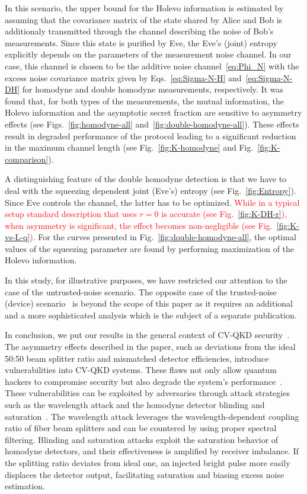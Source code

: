 \documentclass[%
reprint,
superscriptaddress,
 amsmath,amssymb,amsfonts,
 aps,
 pra,
 longbibliography
]{revtex4-2}
\begin{document}
In this scenario, the upper bound for the Holevo information is estimated by assuming that the
covariance matrix of the state shared by Alice and Bob is additionaly transmitted through the
channel describing the noise of Bob's measurements.
Since this state is purified by Eve, the Eve's (joint)
entropy explicitly depends on the parameters of the measurement noise channel.
In our case, this
channel is chosen to be the additive noise channel~\eqref{eq:Phi_N} with
the excess noise covariance matrix given by Eqs.~\eqref{eq:Sigma-N-H}
and~\eqref{eq:Sigma-N-DH} for homodyne and double homodyne measurements,
respectively.
It was found that, for both types of the measurements,
the mutual information, the Holevo information and the asymptotic secret fraction
are sensitive to asymmetry effects (see Figs.~\ref{fig:homodyne-all}
and~\ref{fig:double-homodyne-all}).
These effects result in degraded performance
of the protocol leading to a significant reduction in the maximum channel length
(see Fig.~\ref{fig:K-homodyne} and Fig.~\ref{fig:K-comparison}).

A distinguishing feature of the double homodyne detection is
that we have to deal with the squeezing dependent joint (Eve's) entropy 
(see Fig.~\ref{fig:Entropy}).
Since Eve controls the channel, the latter has to be optimized. \textcolor{red}{While in a typical setup standard description that uses $r=0$ is accurate (see Fig.~\ref{fig:K-DH-r}), when asymmetry is significant, the effect becomes non-negligible (see Fig.~\ref{fig:K-vs-L-q}). }
For the curves presented in Fig.~\ref{fig:double-homodyne-all},
the optimal values of the squeezing parameter
are found by performing maximization of the Holevo information.

In this study,
for illustrative purposes, we have restricted our attention to 
the case of the untrusted-noise scenario.
The opposite case of
the trusted-noise (device)
scenario~\cite{Lodewyck:pra:2007,Usenko:entropy:2016,Laudenbach:aqt:2019}
is beyond the scope of this paper
as it requires
an additional and a more sophisticated analysis which is the subject of a separate publication.

In conclusion,
we put our results in the general context of CV-QKD
  security~\cite{Zhang:apr:2024}.
  The asymmetry effects described in the paper, such as
deviations from the ideal 50:50 beam splitter ratio and mismatched detector efficiencies,
introduce vulnerabilities into CV-QKD systems.  These flaws not only allow quantum hackers to
compromise security but also degrade the system’s performance~\cite{Ruiz:heliyon:2023}.  These
vulnerabilities can be exploited by adversaries through attack strategies such as the wavelength
attack \cite{huang2012wavelength, huang2014quantum} and the homodyne detector blinding
\cite{qin2018homodyne} and saturation~\cite{qin2016quantum}. The wavelength attack leverages the
wavelength-dependent coupling ratio of fiber beam splitters and can be countered by using proper
spectral filtering. Blinding and saturation attacks exploit the saturation behavior of homodyne
detectors, and their effectiveness is amplified by receiver imbalance. If the splitting ratio
deviates from ideal one, an injected bright pulse more easily displaces the detector output,
facilitating saturation and biasing excess noise estimation.
\end{document}
